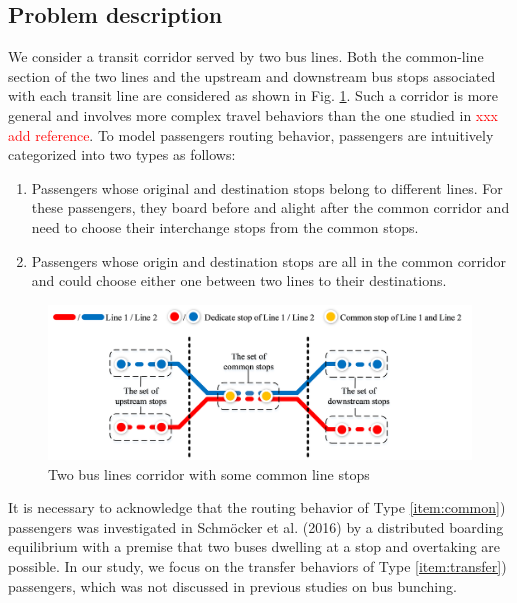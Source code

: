 \documentclass[smallextended]{svjour3}       %
\begin{document}
\begin{Abstract}
\section{Problem description}\label{Problem description}
We consider a transit corridor served by two bus lines. Both the common-line section of the two lines and the upstream and downstream bus stops associated with each transit line are considered as shown in Fig. \ref{fig:Fig1}. Such a corridor is more general and involves more complex travel behaviors than the one studied in \textcolor{red}{xxx add reference}. To model passengers routing behavior, passengers are intuitively categorized into two types as follows:

\begin{enumerate}[Type I)]
    \item \label{item:transfer}Passengers whose original and destination stops belong to different lines. 
    For these passengers, they board before and alight after the common corridor and need to choose their interchange stops from the common stops.
    \item \label{item:common}Passengers whose origin and destination stops are all in the common corridor 
    and could choose either one between two lines to their destinations.
\end{enumerate}

\begin{figure}[H] 
  \centering 
  \includegraphics[width=0.9\linewidth]{CASPT2021paper_fig/Fig1.png} 
  \caption{Two bus lines corridor with some common line stops} 
  \label{fig:Fig1} 
\end{figure}

It is necessary to acknowledge that the routing behavior of Type \ref{item:common}) passengers was investigated 
in \textrm{Schmöcker et al. (2016)} by a distributed boarding equilibrium with a premise that two buses dwelling at a stop and overtaking are possible.
In our study, we focus on the transfer behaviors of Type \ref{item:transfer}) passengers, which was not discussed in previous studies on bus bunching.


\end{Abstract}
\end{document}
